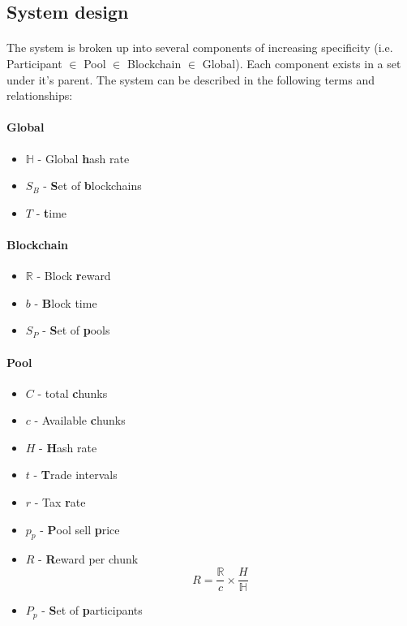 \subsection{System design} %

\paragraph{} The system is broken up into several components of increasing specificity (i.e. Participant $\in$ Pool $\in$ Blockchain $\in$ Global). Each component exists in a set under it's parent. The system can be described in the following terms and relationships:

\paragraph{Global} 

\begin{itemize}
  \item $\mathbb{H}$ - Global \textbf{h}ash rate
  \item $S_B$ - \textbf{S}et of \textbf{b}lockchains
  \item $T$ - \textbf{t}ime
\end{itemize}

\paragraph{Blockchain}

\begin{itemize}
  \item $\mathbb{R}$ - Block \textbf{r}eward
  \item $b$ - \textbf{B}lock time
  \item $S_P$ - \textbf{S}et of \textbf{p}ools
\end{itemize}

\paragraph{Pool}

\begin{itemize}
  \item $C$ - total \textbf{c}hunks
  \item $c$ - Available \textbf{c}hunks
  \item $H$ - \textbf{H}ash rate
  \item $t$ - \textbf{T}rade intervals 
  \item $r$ - Tax \textbf{r}ate
  \item $p_{p}$ - \textbf{P}ool sell \textbf{p}rice
  \item $R$ - \textbf{R}eward per chunk 
    \begin{equation} \label{equation:chunkreward}
      R = \frac{\mathbb{R}}{c} \times \frac{H}{\mathbb{H}}
    \end{equation}
  \item $P_p$ - \textbf{S}et of \textbf{p}articipants
\end{itemize}

